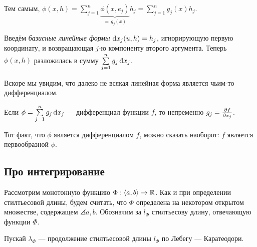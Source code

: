 \documentclass[a4paper]{report}
\begin{document}
    Тем самым, $\phi(x, h) = \sum\limits_{j = 1}^{n}\underbrace{\phi(x, e_j)}_{\eqqcolon g_j(x)}h_j = \sum\limits_{j = 1}^{n}g_j(x)h_j$.

    Введём \emph{базисные линейные формы} $\operatorname{d}\! x_j(u, h) = h_j$, игнорирующую первую координату, и возвращающая $j$-ю компоненту второго аргумента.
    Теперь $\phi(x, h)$ разложилась в сумму $\sum\limits_{j = 1}^{n}g_j \operatorname{d}\! x_j$.

    Вскоре мы увидим, что далеко не всякая линейная форма является чьим-то дифференциалом.

    Если $\phi = \sum\limits_{j = 1}^{n} g_j\operatorname{d}\! x_j$ --- дифференциал функции $f$, то непременно $g_j = \frac{\partial f}{\partial x_j}$.

    Тот факт, что $\phi$ является дифференциалом $f$, можно сказать наоборот: $f$ является первообразной $\phi$.
    \subsection{Про интегрирование}
    Рассмотрим монотонную функцию $\Phi: \left\langle a, b\right\rangle \rightarrow \mathbb{R}$.
    Как и при определении стилтьесовой длины, будем считать, что $\Phi$ определена на некотором открытом множестве, содержащем $\angles{a, b}$.
    Обозначим за $l_\Phi$ стилтьесову длину, отвечающую функции $\Phi$.

     Пускай $\lambda_\Phi$ --- продолжение стилтьесовой длины $l_\Phi$ по Лебегу --- Каратеодори.
\end{document}

